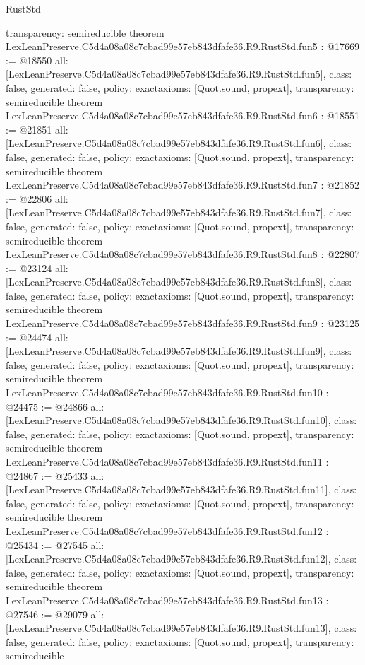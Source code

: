 \begin{lexlean}{RustStd}
\begin{coremodule}
{  transparency: semireducible
}
theorem LexLeanPreserve.C5d4a08a08c7cbad99e57eb843dfafe36.R9.RustStd.fun5 : @17669 := @18550 {
  all: [LexLeanPreserve.C5d4a08a08c7cbad99e57eb843dfafe36.R9.RustStd.fun5],
  class: false,
  generated: false,
  policy: exact{axioms: [Quot.sound, propext]},
  transparency: semireducible
}
theorem LexLeanPreserve.C5d4a08a08c7cbad99e57eb843dfafe36.R9.RustStd.fun6 : @18551 := @21851 {
  all: [LexLeanPreserve.C5d4a08a08c7cbad99e57eb843dfafe36.R9.RustStd.fun6],
  class: false,
  generated: false,
  policy: exact{axioms: [Quot.sound, propext]},
  transparency: semireducible
}
theorem LexLeanPreserve.C5d4a08a08c7cbad99e57eb843dfafe36.R9.RustStd.fun7 : @21852 := @22806 {
  all: [LexLeanPreserve.C5d4a08a08c7cbad99e57eb843dfafe36.R9.RustStd.fun7],
  class: false,
  generated: false,
  policy: exact{axioms: [Quot.sound, propext]},
  transparency: semireducible
}
theorem LexLeanPreserve.C5d4a08a08c7cbad99e57eb843dfafe36.R9.RustStd.fun8 : @22807 := @23124 {
  all: [LexLeanPreserve.C5d4a08a08c7cbad99e57eb843dfafe36.R9.RustStd.fun8],
  class: false,
  generated: false,
  policy: exact{axioms: [Quot.sound, propext]},
  transparency: semireducible
}
theorem LexLeanPreserve.C5d4a08a08c7cbad99e57eb843dfafe36.R9.RustStd.fun9 : @23125 := @24474 {
  all: [LexLeanPreserve.C5d4a08a08c7cbad99e57eb843dfafe36.R9.RustStd.fun9],
  class: false,
  generated: false,
  policy: exact{axioms: [Quot.sound, propext]},
  transparency: semireducible
}
theorem LexLeanPreserve.C5d4a08a08c7cbad99e57eb843dfafe36.R9.RustStd.fun10 : @24475 := @24866 {
  all: [LexLeanPreserve.C5d4a08a08c7cbad99e57eb843dfafe36.R9.RustStd.fun10],
  class: false,
  generated: false,
  policy: exact{axioms: [Quot.sound, propext]},
  transparency: semireducible
}
theorem LexLeanPreserve.C5d4a08a08c7cbad99e57eb843dfafe36.R9.RustStd.fun11 : @24867 := @25433 {
  all: [LexLeanPreserve.C5d4a08a08c7cbad99e57eb843dfafe36.R9.RustStd.fun11],
  class: false,
  generated: false,
  policy: exact{axioms: [Quot.sound, propext]},
  transparency: semireducible
}
theorem LexLeanPreserve.C5d4a08a08c7cbad99e57eb843dfafe36.R9.RustStd.fun12 : @25434 := @27545 {
  all: [LexLeanPreserve.C5d4a08a08c7cbad99e57eb843dfafe36.R9.RustStd.fun12],
  class: false,
  generated: false,
  policy: exact{axioms: [Quot.sound, propext]},
  transparency: semireducible
}
theorem LexLeanPreserve.C5d4a08a08c7cbad99e57eb843dfafe36.R9.RustStd.fun13 : @27546 := @29079 {
  all: [LexLeanPreserve.C5d4a08a08c7cbad99e57eb843dfafe36.R9.RustStd.fun13],
  class: false,
  generated: false,
  policy: exact{axioms: [Quot.sound, propext]},
  transparency: semireducible
}
\end{coremodule}
\end{lexlean}
